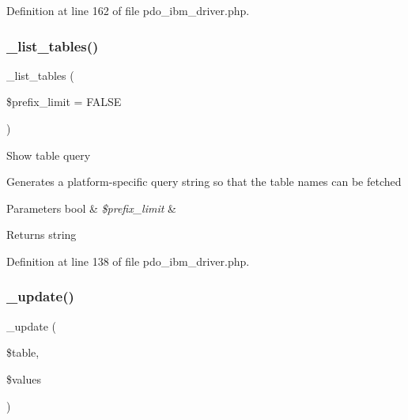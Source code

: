 Definition at line 162 of file pdo\+\_\+ibm\+\_\+driver.\+php.

\mbox{\label{class_c_i___d_b__pdo__ibm__driver_a435c0f3ce54fe7daa178baa8532ebd54}} 
\subsubsection{\texorpdfstring{\_list\_tables()}{\_list\_tables()}}
{\footnotesize\ttfamily \+\_\+list\+\_\+tables (\begin{DoxyParamCaption}\item[{}]{\$prefix\+\_\+limit = {\ttfamily FALSE} }\end{DoxyParamCaption})\hspace{0.3cm}{\ttfamily [protected]}}

Show table query

Generates a platform-\/specific query string so that the table names can be fetched


\begin{DoxyParams}[1]{Parameters}
bool & {\em \$prefix\+\_\+limit} & \\
\hline
\end{DoxyParams}
\begin{DoxyReturn}{Returns}
string 
\end{DoxyReturn}


Definition at line 138 of file pdo\+\_\+ibm\+\_\+driver.\+php.

\mbox{\label{class_c_i___d_b__pdo__ibm__driver_a2540b03a93fa73ae74c10d0e16fc073e}} 
\subsubsection{\texorpdfstring{\_update()}{\_update()}}
{\footnotesize\ttfamily \+\_\+update (\begin{DoxyParamCaption}\item[{}]{\$table,  }\item[{}]{\$values }\end{DoxyParamCaption})\hspace{0.3cm}{\ttfamily [protected]}}

